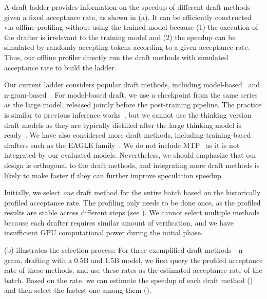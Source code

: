 A draft ladder provides information on the speedup of different draft methods
given a fixed acceptance rate,
as shown in { (a)}.
It can be efficiently constructed via offline profiling
without using the trained model because
(1) the execution of the drafter is irrelevant to the training model and
(2) the speedup can be simulated by randomly accepting tokens according 
to a given acceptance rate.
Thus, our offline profiler directly run the draft methods
with simulated acceptance rate to build the ladder. 

Our current ladder considers popular draft methods, 
including model-based~\cite{spd,specinfer} and n-gram-based~\cite{pld,lookahead,DBLP:conf/acl/HuWZZLCZ25}. 
{For model-based draft, we use a checkpoint from the same series as the large model, 
released jointly before the post-training pipeline.
The practice is similar to previous inference works~\cite{spd,specinfer},
but we cannot use the thinking version draft models as they are typically
distilled after the large thinking model is ready~\cite{deepseek-r1,qwen3}.}
{We have also considered more draft methods,
including training-based drafters
such as the EAGLE family~\cite{eagle,eagle-2,eagle-3}.}
{We do not include MTP~\cite{DBLP:journals/corr/abs-2412-19437} as it is not 
integrated by our evaluated models.}
Nevertheless, we should emphasize that our design
is orthogonal to the draft methods,
and integrating more draft methods is likely to
make {\sys} faster if they can further improve speculation speedup.

Initially, we select \emph{one} draft method for
the entire batch based on the historically profiled acceptance rate.
{The profiling only needs to be done once, 
as the profiled results are stable across different steps 
(see ).}
We cannot select multiple methods because each drafter requires 
similar amount of verification, 
and we have insufficient GPU computational power
during the initial phase.

{ (b)} illustrates the selection process:
For three exemplified draft methods---n-gram, drafting with a 0.5B
and 1.5B model,
we first query the profiled acceptance rate of these methods,
and use these rates as the estimated acceptance rate of the batch.
Based on the rate, we can estimate the speedup of each draft method ()
and then select the fastest one among them ().

